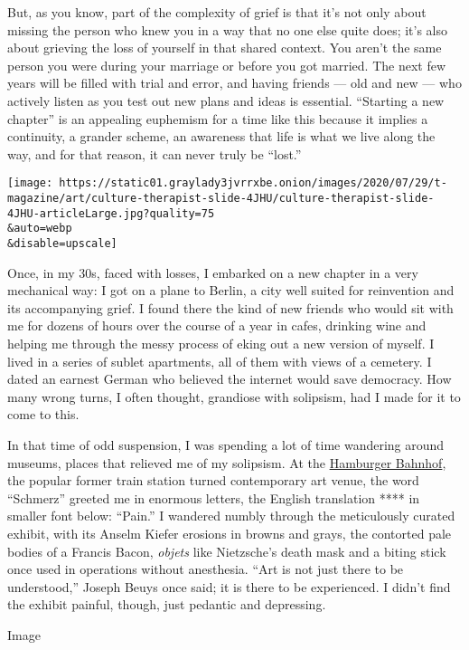 But, as you know, part of the complexity of grief is that it's not only
about missing the person who knew you in a way that no one else quite
does; it's also about grieving the loss of yourself in that shared
context. You aren't the same person you were during your marriage or
before you got married. The next few years will be filled with trial and
error, and having friends --- old and new --- who actively listen as you
test out new plans and ideas is essential. ``Starting a new chapter'' is
an appealing euphemism for a time like this because it implies a
continuity, a grander scheme, an awareness that life is what we live
along the way, and for that reason, it can never truly be ``lost.''

\texttt{[image: https://static01.graylady3jvrrxbe.onion/images/2020/07/29/t-magazine/art/culture-therapist-slide-4JHU/culture-therapist-slide-4JHU-articleLarge.jpg?quality=75\\\&auto=webp\\\&disable=upscale]}

Once, in my 30s, faced with losses, I embarked on a new chapter in a
very mechanical way: I got on a plane to Berlin, a city well suited for
reinvention and its accompanying grief. I found there the kind of new
friends who would sit with me for dozens of hours over the course of a
year in cafes, drinking wine and helping me through the messy process of
eking out a new version of myself. I lived in a series of sublet
apartments, all of them with views of a cemetery. I dated an earnest
German who believed the internet would save democracy. How many wrong
turns, I often thought, grandiose with solipsism, had I made for it to
come to this.

In that time of odd suspension, I was spending a lot of time wandering
around museums, places that relieved me of my solipsism. At the
\href{https://www.nytimes3xbfgragh.onion/2018/04/24/arts/berlin-hamburger-banhof.html}{Hamburger
Bahnhof}, the popular former train station turned contemporary art
venue, the word ``Schmerz'' greeted me in enormous letters, the English
translation **** in smaller font below: ``Pain.'' I wandered numbly
through the meticulously curated exhibit, with its Anselm Kiefer
erosions in browns and grays, the contorted pale bodies of a Francis
Bacon, \emph{objets} like Nietzsche's death mask and a biting stick once
used in operations without anesthesia. ``Art is not just there to be
understood,'' Joseph Beuys once said; it is there to be experienced. I
didn't find the exhibit painful, though, just pedantic and depressing.

Image

